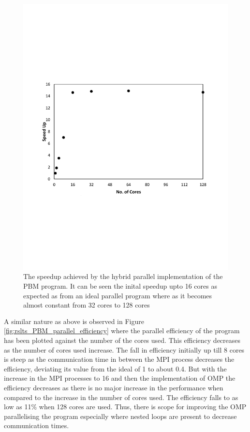 \documentclass[preprint,11pt,authoryear]{elsarticle}
\begin{document}
\begin{figure}[H]
\centering
\includegraphics[scale=0.7]{rslts_PBM_Speed_Up.pdf}
\caption{The speedup achieved by the hybrid parallel implementation of the PBM program. It can be 
    seen the inital speedup upto 16 cores as expected as from an ideal parallel program where as it 
    becomes almost constant from 32 cores to 128 cores}
\label{fig:rslts_PBM_speed_up}
\end{figure}

A similar nature as above is observed in Figure \ref{fig:rslts_PBM_parallel_efficiency} where the parallel 
efficiency of the program has been plotted against the number of the cores used. This efficiency 
decreases as the number of cores used increase. The fall in efficiency initially up till 8 cores is steep as 
the communication time in between the MPI process decreases the efficiency, deviating its value from 
the ideal of 1 to about 0.4. But with the increase in the MPI processes to 16 and then the 
implementation of OMP the efficiency decreases as there is no major increase in the performance 
when compared to the increase in the number of cores used. The efficiency falls to as low as 11\% 
when 128 cores are used. Thus, there is scope for improving the OMP parallelising the program 
especially where nested loops are present to decrease communication times.
\end{document}
